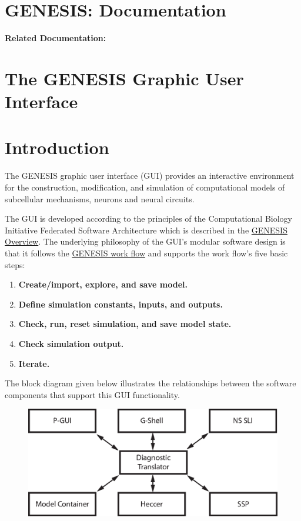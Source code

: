 \documentclass[12pt]{article}
\begin{document}
\section*{GENESIS: Documentation}

{\bf Related Documentation:}

\section*{The GENESIS Graphic User Interface}

\section*{Introduction}

The GENESIS graphic user interface (GUI) provides an interactive environment for the construction, modification, and simulation of computational models of subcellular mechanisms, neurons and neural circuits.

The GUI is developed according to the principles of the Computational Biology Initiative Federated Software Architecture which is described in the \href{../genesis-overview/genesis-overview.tex}{GENESIS Overview}. The underlying philosophy of the GUI's modular software design is that it follows the \href{../workflow-intro/workflow-intro.tex}{GENESIS work flow} and supports the work flow's five basic steps:
\begin{enumerate}
\item {\bf Create/import, explore, and save model.}
\item {\bf Define simulation constants, inputs, and outputs.}
\item {\bf Check, run, reset simulation, and save model state.}
\item {\bf Check simulation output.}
\item {\bf Iterate.}
\end{enumerate}
The block diagram given below illustrates the relationships between the software components that support this GUI functionality.

\begin{figure}[h]
  \centering
\includegraphics[scale=0.6]{figures/gui-isolated.eps}
  \label{fig:df-1}
\end{figure}
\end{document}
